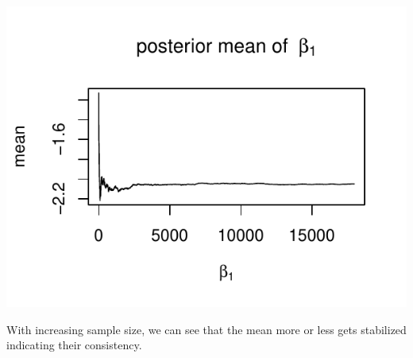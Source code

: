 \documentclass[11pt,english]{article}\usepackage[]{graphicx}\usepackage[]{xcolor}
\makeatletter
\def\maxwidth{ %
  \ifdim\Gin@nat@width>\linewidth
    \linewidth
  \else
    \Gin@nat@width
  \fi
}
\newenvironment{kframe}{%
 \def\at@end@of@kframe{}%
 \ifinner\ifhmode%
  \def\at@end@of@kframe{\end{minipage}}%
  \begin{minipage}{\columnwidth}%
 \fi\fi%
 \def\FrameCommand##1{\hskip\@totalleftmargin \hskip-\fboxsep
 \colorbox{shadecolor}{##1}\hskip-\fboxsep
     \hskip-\linewidth \hskip-\@totalleftmargin \hskip\columnwidth}%
 \MakeFramed {\advance\hsize-\width
   \@totalleftmargin\z@ \linewidth\hsize
   \@setminipage}}%
 {\par\unskip\endMakeFramed%
 \at@end@of@kframe}
\newenvironment{knitrout}{}{} %
\makeatother
\begin{document}
\begin{center}
\begin{knitrout}
\begin{kframe}
\begin{alltt}
\end{alltt}
\end{kframe}
\includegraphics[width=\maxwidth]{figure/unnamed-chunk-21-2} 
\end{knitrout}
\par\end{center}

With increasing sample size, we can see that the mean more or less
gets stabilized indicating their consistency.
\end{document}
